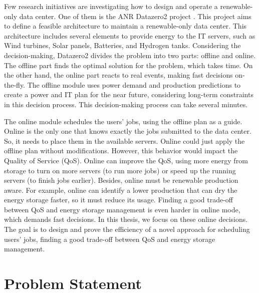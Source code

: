 Few research initiatives are investigating how to design and operate a renewable-only data center. One of them is the ANR Datazero2 project \cite{Datazero}. This project aims to define a feasible architecture to maintain a renewable-only data center. This architecture includes several elements to provide energy to the IT servers, such as Wind turbines, Solar panels, Batteries, and Hydrogen tanks. Considering the decision-making, Datazero2 divides the problem into two parts: offline and online. The offline part finds the optimal solution for the problem, which takes time. On the other hand, the online part reacts to real events, making fast decisions on-the-fly. The offline module uses power demand and production predictions to create a power and IT plan for the near future, considering long-term constraints in this decision process. This decision-making process can take several minutes.

The online module schedules the users' jobs, using the offline plan as a guide. Online is the only one that knows exactly the jobs submitted to the data center. So, it needs to place them in the available servers. Online could just apply the offline plan without modifications. However, this behavior would impact the Quality of Service (QoS). Online can improve the QoS, using more energy from storage to turn on more servers (to run more jobs) or speed up the running servers (to finish jobs earlier). Besides, online must be renewable production aware. For example, online can identify a lower production that can dry the energy storage faster, so it must reduce its usage. Finding a good trade-off between QoS and energy storage management is even harder in online mode, which demands fast decisions. In this thesis, we focus on these online decisions. The goal is to design and prove the efficiency of a novel approach for scheduling users' jobs, finding a good trade-off between QoS and energy storage management.

\section{Problem Statement}


